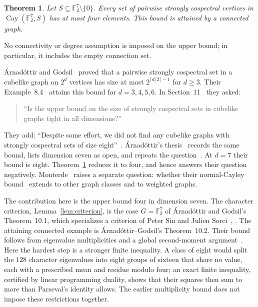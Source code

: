 \documentclass[11pt]{article}
\newtheorem{theorem}{Theorem}[section]
\theoremstyle{definition}
\newcommand{\F}{\mathbb F}
\newcommand{\Cay}{\operatorname{Cay}}
\begin{document}
\begin{theorem}\label{thm:main}
Let $S\subseteq\F_2^7\setminus\{0\}$. Every set of pairwise strongly
cospectral vertices in $\Cay(\F_2^7,S)$ has at most four elements.
This bound is attained by a connected graph.
\end{theorem}

No connectivity or degree assumption is imposed on the upper bound; in
particular, it includes the empty connection set.

\'Arnad\'ottir and Godsil~\cite[Corollary~8.3]{AG} proved that a pairwise
strongly cospectral set in a cubelike graph on $2^d$ vertices has size at
most $2^{\lceil d/2\rceil-1}$ for $d\geq3$.
Their Example~8.4~\cite{AG} attains this bound for $d=3,4,5,6$.
In Section~11~\cite{AG} they asked:
\begin{quote}
``Is the upper bound on the size of strongly cospectral sets in cubelike
graphs tight in all dimensions?''
\end{quote}
They add: ``Despite some effort, we did not find any cubelike graphs with
strongly cospectral sets of size eight''~\cite[Section~11]{AG}.
\'Arnad\'ottir's thesis~\cite[Corollary~5.6.6 and Table~5.1]{ArnadottirThesis}
records the same bound, lists dimension seven as open, and repeats the
question~\cite[Section~7.1]{ArnadottirThesis}.
At $d=7$ their bound is eight. Theorem~\ref{thm:main} reduces it to four,
and hence answers their question negatively.
Monterde~\cite[Section~3, paragraph after Theorem~3.11]{Monterde} raises
a separate question: whether their normal-Cayley
bound~\cite[Theorem~6.1]{AG} extends to other graph classes and to
weighted graphs.

The contribution here is the upper bound four in dimension seven.
The character criterion, Lemma~\ref{lem:criterion}, is the case
$G=\F_2^7$ of \'Arnad\'ottir and Godsil's Theorem~10.1, which
specializes a criterion of Peter Sin and Julien
Sorci~\cite[Theorem~5.2]{AG}, \cite[Theorems~2.3--2.4]{SinSorci}.
The attaining connected example is \'Arnad\'ottir--Godsil's Theorem~10.2.
Their bound follows from eigenvalue multiplicities and a global
second-moment argument~\cite[Lemma~7.2 and Theorems~6.1 and~8.2]{AG}.
Here the hardest step is a stronger finite inequality. A class of eight
would split the $128$ character eigenvalues into eight groups of sixteen
that share no value, each with a prescribed mean and residue modulo
four; an exact finite inequality, certified by linear programming
duality, shows that their squares then sum to more than Parseval's
identity allows. The earlier multiplicity bound does not impose these
restrictions together.
\end{document}
